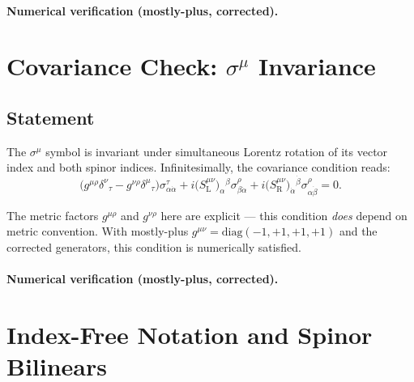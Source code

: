 \paragraph{Numerical verification (mostly-plus, corrected).}

\section{Covariance Check: \texorpdfstring{$\sigma^\mu$}{sigma\^{}mu}
         Invariance \quad [eq.~35.14]}

\subsection{Statement}

The $\sigma^\mu$ symbol is invariant under simultaneous Lorentz
rotation of its vector index and both spinor indices.
Infinitesimally, the covariance condition reads:
\begin{equation}
  \bigl(g^{\mu\rho}\delta^{\nu}{}_\tau - g^{\nu\rho}\delta^{\mu}{}_\tau\bigr)
  \sigma^\tau_{\alpha\dot\alpha}
  + i\bigl(S^{\mu\nu}_{\mathrm{L}}\bigr)_\alpha{}^\beta
    \sigma^\rho_{\beta\dot\alpha}
  + i\bigl(S^{\mu\nu}_{\mathrm{R}}\bigr)_{\dot\alpha}{}^{\dot\beta}
    \sigma^\rho_{\alpha\dot\beta}
  = 0.
  \tag{35.14}
\end{equation}

The metric factors $g^{\mu\rho}$ and $g^{\nu\rho}$ here are explicit
--- this condition \emph{does} depend on metric convention.
With mostly-plus $g^{\mu\nu}=\mathrm{diag}(-1,+1,+1,+1)$ and the
corrected generators, this condition is numerically satisfied.

\paragraph{Numerical verification (mostly-plus, corrected).}

\section{Index-Free Notation and Spinor Bilinears \quad [eq.~35.23--35.29]}

